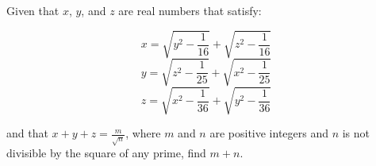 Given that $x$, $y$, and $z$ are real numbers that satisfy:

\[ x=\sqrt{y^2-\frac{1}{16}}+\sqrt{z^2-\frac{1}{16}} \]
\[ y=\sqrt{z^2-\frac{1}{25}}+\sqrt{x^2-\frac{1}{25}} \]
\[ z=\sqrt{x^2-\frac{1}{36}}+\sqrt{y^2-\frac{1}{36}} \]

and that $x+y+z=\frac{m}{\sqrt{n}}$, where $m$ and $n$ are positive integers and $n$ is not divisible by the square of any prime, find $m+n$.
